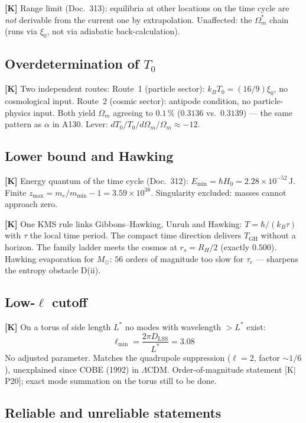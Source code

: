 \textbf{[K]} Range limit (Doc.~313): equilibria at other locations on
the time cycle are \emph{not} derivable from the current one by
extrapolation. Unaffected: the $\Omega_m^*$ chain (runs via $\xi_0$,
not via adiabatic back-calculation).

\subsection{Overdetermination of $T_0$}

\textbf{[K]} Two independent routes:
Route~1 (particle sector): $k_BT_0 = (16/9)\xi_0$, no cosmological input.
Route~2 (cosmic sector): antipode condition, no particle-physics input.
Both yield $\Omega_m$ agreeing to $0{.}1\,\%$
($0{.}3136$ vs.\ $0{.}3139$) --- the same pattern as $\alpha$ in A130.
Lever: $dT_0/T_0 \big/ d\Omega_m/\Omega_m \approx -12$.

\subsection{Lower bound and Hawking}

\textbf{[K]} Energy quantum of the time cycle (Doc.~312):
$E_\text{min} = \hbar H_0 = 2{.}28\times10^{-52}$\,J.
Finite $z_\text{max} = m_e/m_\text{min} - 1 = 3{.}59\times10^{38}$.
Singularity excluded: masses cannot approach zero.

\textbf{[K]} One KMS rule links Gibbons--Hawking, Unruh and Hawking:
$T = \hbar/(k_B\tau)$ with $\tau$ the local time period.
The compact time direction delivers $T_\text{GH}$ without a horizon.
The family ladder meets the cosmos at $r_s = R_H/2$ (exactly $0{.}500$).
Hawking evaporation for $M_\odot$: $56$ orders of magnitude too slow
for $\tau_c$ --- sharpens the entropy obstacle D(ii).

\subsection{Low-$\ell$ cutoff}

\textbf{[K]} On a torus of side length $L^*$ no modes with wavelength
$> L^*$ exist:
\[
  \ell_\text{min} = \frac{2\pi D_\text{LSS}}{L^*} = 3{.}08
\]
No adjusted parameter. Matches the quadrupole suppression
($\ell = 2$, factor $\sim 1/6$), unexplained since COBE (1992)
in $\Lambda$CDM. Order-of-magnitude statement [K$|$P20]; exact mode
summation on the torus still to be done.

\subsection{Reliable and unreliable statements}

